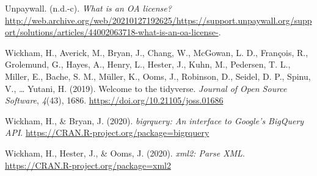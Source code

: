 \documentclass[a4paper,man,floatsintext,longtable,noextraspace,12pt]{apa6}
\newlength{\cslhangindent}
\newenvironment{cslreferences}%
  {\setlength{\parindent}{0pt}%
  \everypar{\setlength{\hangindent}{\cslhangindent}}\ignorespaces}%
  {\par}
\begin{document}
\begin{cslreferences}
\leavevmode\hypertarget{ref-Unpaywall_oa_license}{}%
Unpaywall. (n.d.-c). \emph{What is an OA license?}
\url{http://web.archive.org/web/20210127192625/https://support.unpaywall.org/support/solutions/articles/44002063718-what-is-an-oa-license-}.

\leavevmode\hypertarget{ref-tidyverse}{}%
Wickham, H., Averick, M., Bryan, J., Chang, W., McGowan, L. D.,
François, R., Grolemund, G., Hayes, A., Henry, L., Hester, J., Kuhn, M.,
Pedersen, T. L., Miller, E., Bache, S. M., Müller, K., Ooms, J.,
Robinson, D., Seidel, D. P., Spinu, V., \ldots{} Yutani, H. (2019).
Welcome to the tidyverse. \emph{Journal of Open Source Software},
\emph{4}(43), 1686. \url{https://doi.org/10.21105/joss.01686}

\leavevmode\hypertarget{ref-bigrquery}{}%
Wickham, H., \& Bryan, J. (2020). \emph{bigrquery: An interface to
Google's BigQuery API}.
\url{https://CRAN.R-project.org/package=bigrquery}

\leavevmode\hypertarget{ref-xml2}{}%
Wickham, H., Hester, J., \& Ooms, J. (2020). \emph{xml2: Parse XML}.
\url{https://CRAN.R-project.org/package=xml2}
\end{cslreferences}
\end{document}
